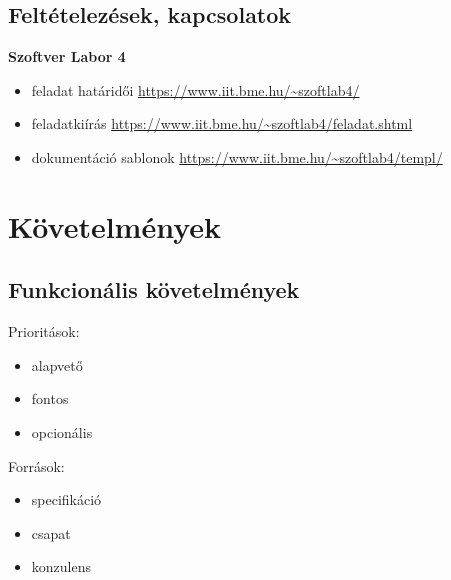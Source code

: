 \subsection{Feltételezések, kapcsolatok}
\textbf{Szoftver Labor 4}
\begin{itemize}
\item feladat határidői \url{https://www.iit.bme.hu/~szoftlab4/}
\item feladatkiírás \url{https://www.iit.bme.hu/~szoftlab4/feladat.shtml}
\item dokumentáció sablonok \url{https://www.iit.bme.hu/~szoftlab4/templ/}
\end{itemize}

 

\section{Követelmények}
\subsection{Funkcionális követelmények}
Prioritások:
\begin{itemize}
\item alapvető
\item fontos
\item opcionális
\end{itemize}
Források:
\begin{itemize}
\item specifikáció
\item csapat
\item konzulens
\end{itemize}

